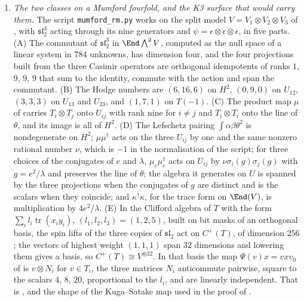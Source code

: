 \begin{enumerate}[label=\textup{(\Roman*)},leftmargin=*]
\item \emph{The two classes on a Mumford fourfold, and the K3 surface that
  would carry them.} The script \texttt{mumford\_\allowbreak rm.py} works on
  the split model $V=V_{1}\otimes V_{2}\otimes V_{3}$ of
  , with $\mathfrak{sl}_{2}^{3}$ acting through its nine
  generators and $\psi=\epsilon\otimes\epsilon\otimes\epsilon$, in five parts.
  (A) The commutant of $\mathfrak{sl}_{2}^{3}$ in $\End\bigwedge^{2}V$,
  computed as the null space of a linear system in $784$ unknowns, has
  dimension four, and the four projections built from the three Casimir
  operators are orthogonal idempotents of ranks $1$, $9$, $9$, $9$ that sum to
  the identity, commute with the action and span the commutant. (B) The Hodge
  numbers are $(6,16,6)$ on $H^{2}$, $(0,9,0)$ on $U_{12}$, $(3,3,3)$ on
  $U_{13}$ and $U_{23}$, and $(1,7,1)$ on $T(-1)$. (C) The product map $\mu$ of
   carries $T_{i}\otimes T_{j}$ onto $U_{ij}$ with rank nine
  for $i\ne j$ and $T_{i}\otimes T_{i}$ onto the line of $\theta$, and its
  image is all of $H^{2}$. (D) The Lefschetz pairing
  $\int\alpha\beta\theta^{2}$ is nondegenerate on $H^{2}$; $\mu\mu^{\dagger}$
  acts on the three $U_{ij}$ by one and the same nonzero rational number
  $\nu$, which is $-1$ in the normalisation of the script; for three choices of
  the conjugates of $e$ and $\lambda$, $\mu_{e}\mu_{e}^{\dagger}$ acts on
  $U_{ij}$ by $\nu\sigma_{i}(g)\sigma_{j}(g)$ with $g=e^{2}/\lambda$ and
  preserves the line of $\theta$; the algebra it generates on $U$ is spanned by
  the three projections when the conjugates of $g$ are distinct and is the
  scalars when they coincide; and $\kappa^{\dagger}\kappa$, for the trace form
  on $\End(V)$, is multiplication by $4e^{2}/\lambda$. (E) In the Clifford
  algebra of $T$ with the form $\sum_{i}l_{i}\operatorname{tr}(x_{i}y_{i})$,
  $(l_{1},l_{2},l_{3})=(1,2,5)$, built on bit masks of an orthogonal basis,
  the spin lifts of the three copies of $\mathfrak{sl}_{2}$ act on $C^{+}(T)$,
  of dimension $256$; the vectors of highest weight $(1,1,1)$ span $32$
  dimensions and lowering them gives a basis, so $C^{+}(T)\cong V^{\oplus32}$.
  In that basis the map $\Psi(v)x=vxv_{0}$ of  is
  $v\otimes N_{i}$ for $v\in T_{i}$, the three matrices $N_{i}$ anticommute
  pairwise, square to the scalars $4$, $8$, $20$, proportional to the $l_{i}$,
  and are linearly independent. That is ,
   and the shape of the Kuga--Satake map used in the proof
  of .


\end{enumerate}
